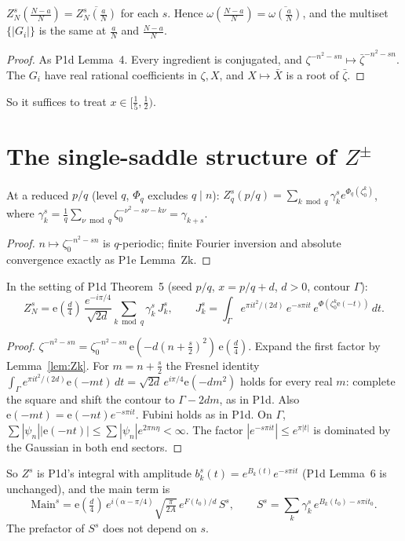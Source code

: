 \documentclass[11pt]{article}
\theoremstyle{definition}\newtheorem{definition}[theorem]{Definition}
\theoremstyle{remark}\newtheorem{remark}[theorem]{Remark}
\newcommand{\e}{\mathrm{e}}
\begin{document}
\begin{lemma}\label{lem:conj}
$Z^s_N(\frac{N-a}N)=\overline{Z^s_N(\frac aN)}$ for each $s$. Hence $\omega(\frac{N-a}N)=\overline{\omega(\frac aN)}$, and the multiset $\{|G_i|\}$ is the same at $\frac aN$ and $\frac{N-a}N$.
\end{lemma}
\begin{proof}
As P1d Lemma~4. Every ingredient is conjugated, and $\zeta^{-n^2-sn}\mapsto\bar\zeta^{-n^2-sn}$. The $G_i$ have real rational coefficients in $\zeta,X$, and $X\mapsto\bar X$ is a root of $\bar\zeta$.
\end{proof}
So it suffices to treat $x\in[\frac15,\frac12)$.

\section{The single-saddle structure of $Z^\pm$}\label{sec:struct}
\begin{lemma}\label{lem:Zk}
At a reduced $p/q$ (level $q$, $\Phi_q$ excludes $q\mid n$): $Z^s_q(p/q)=\sum_{k\bmod q}\gamma^s_k e^{\Phi_q(\zeta_0^k)}$, where $\gamma^s_k=\frac1q\sum_{\nu\bmod q}\zeta_0^{-\nu^2-s\nu-k\nu}=\gamma_{k+s}$.
\end{lemma}
\begin{proof}
$n\mapsto\zeta_0^{-n^2-sn}$ is $q$-periodic; finite Fourier inversion and absolute convergence exactly as P1e Lemma~Zk.
\end{proof}

\begin{lemma}\label{lem:F}
In the setting of P1d Theorem~5 (seed $p/q$, $x=p/q+d$, $d>0$, contour $\Gamma$):
\[Z^s_N=\e(\tfrac d4)\,\frac{e^{-i\pi/4}}{\sqrt{2d}}\sum_{k\bmod q}\gamma^s_k\,J^s_k,\qquad J^s_k=\int_\Gamma e^{\pi it^2/(2d)}\,e^{-s\pi it}\,e^{\Phi(\zeta_0^k\e(-t))}\,dt .\]
\end{lemma}
\begin{proof}
$\zeta^{-n^2-sn}=\zeta_0^{-n^2-sn}\,\e(-d(n+\frac s2)^2)\,\e(\frac d4)$. Expand the first factor by Lemma~\ref{lem:Zk}. For $m=n+\frac s2$ the Fresnel identity $\int_\Gamma e^{\pi it^2/(2d)}\e(-mt)\,dt=\sqrt{2d}\,e^{i\pi/4}\e(-dm^2)$ holds for every real $m$: complete the square and shift the contour to $\Gamma-2dm$, as in P1d. Also $\e(-mt)=\e(-nt)e^{-s\pi it}$.
Fubini holds as in P1d. On $\Gamma$, $\sum|\psi_n||\e(-nt)|\le\sum|\psi_n|e^{2\pi n\eta}<\infty$. The factor $|e^{-s\pi it}|\le e^{\pi|t|}$ is dominated by the Gaussian in both end sectors.
\end{proof}
So $Z^s$ is P1d's integral with amplitude $b^s_k(t)=e^{B_k(t)}e^{-s\pi it}$ (P1d Lemma~6 is unchanged), and the main term is
\[\mathrm{Main}^s=\e(\tfrac d4)\,e^{i(\alpha-\pi/4)}\sqrt{\tfrac\pi{2A}}\,e^{F(t_0)/d}\,S^s,\qquad S^s=\sum_k\gamma^s_k\,e^{B_k(t_0)-s\pi it_0}.\]
The prefactor of $S^s$ does not depend on $s$.
\end{document}
